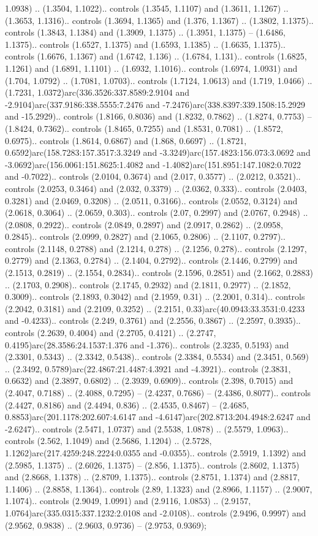 1.0938) .. (1.3504, 1.1022).. controls (1.3545, 1.1107) and (1.3611, 1.1267) .. (1.3653, 1.1316).. controls (1.3694, 1.1365) and (1.376, 1.1367) .. (1.3802, 1.1375).. controls (1.3843, 1.1384) and (1.3909, 1.1375) .. (1.3951, 1.1375) -- (1.6486, 1.1375).. controls (1.6527, 1.1375) and (1.6593, 1.1385) .. (1.6635, 1.1375).. controls (1.6676, 1.1367) and (1.6742, 1.136) .. (1.6784, 1.131).. controls (1.6825, 1.1261) and (1.6891, 1.1101) .. (1.6932, 1.1016).. controls (1.6974, 1.0931) and (1.704, 1.0792) .. (1.7081, 1.0703).. controls (1.7124, 1.0613) and (1.719, 1.0466) .. (1.7231, 1.0372)arc(336.3526:337.8589:2.9104 and -2.9104)arc(337.9186:338.5555:7.2476 and -7.2476)arc(338.8397:339.1508:15.2929 and -15.2929).. controls (1.8166, 0.8036) and (1.8232, 0.7862) .. (1.8274, 0.7753) -- (1.8424, 0.7362).. controls (1.8465, 0.7255) and (1.8531, 0.7081) .. (1.8572, 0.6975).. controls (1.8614, 0.6867) and (1.868, 0.6697) .. (1.8721, 0.6592)arc(158.7283:157.3517:3.3249 and -3.3249)arc(157.4823:156.073:3.0692 and -3.0692)arc(156.0061:151.8625:1.4082 and -1.4082)arc(151.8951:147.1082:0.7022 and -0.7022).. controls (2.0104, 0.3674) and (2.017, 0.3577) .. (2.0212, 0.3521).. controls (2.0253, 0.3464) and (2.032, 0.3379) .. (2.0362, 0.333).. controls (2.0403, 0.3281) and (2.0469, 0.3208) .. (2.0511, 0.3166).. controls (2.0552, 0.3124) and (2.0618, 0.3064) .. (2.0659, 0.303).. controls (2.07, 0.2997) and (2.0767, 0.2948) .. (2.0808, 0.2922).. controls (2.0849, 0.2897) and (2.0917, 0.2862) .. (2.0958, 0.2845).. controls (2.0999, 0.2827) and (2.1065, 0.2806) .. (2.1107, 0.2797).. controls (2.1148, 0.2788) and (2.1214, 0.278) .. (2.1256, 0.278).. controls (2.1297, 0.2779) and (2.1363, 0.2784) .. (2.1404, 0.2792).. controls (2.1446, 0.2799) and (2.1513, 0.2819) .. (2.1554, 0.2834).. controls (2.1596, 0.2851) and (2.1662, 0.2883) .. (2.1703, 0.2908).. controls (2.1745, 0.2932) and (2.1811, 0.2977) .. (2.1852, 0.3009).. controls (2.1893, 0.3042) and (2.1959, 0.31) .. (2.2001, 0.314).. controls (2.2042, 0.3181) and (2.2109, 0.3252) .. (2.2151, 0.33)arc(40.0943:33.3531:0.4233 and -0.4233).. controls (2.249, 0.3761) and (2.2556, 0.3867) .. (2.2597, 0.3935).. controls (2.2639, 0.4004) and (2.2705, 0.4121) .. (2.2747, 0.4195)arc(28.3586:24.1537:1.376 and -1.376).. controls (2.3235, 0.5193) and (2.3301, 0.5343) .. (2.3342, 0.5438).. controls (2.3384, 0.5534) and (2.3451, 0.569) .. (2.3492, 0.5789)arc(22.4867:21.4487:4.3921 and -4.3921).. controls (2.3831, 0.6632) and (2.3897, 0.6802) .. (2.3939, 0.6909).. controls (2.398, 0.7015) and (2.4047, 0.7188) .. (2.4088, 0.7295) -- (2.4237, 0.7686) -- (2.4386, 0.8077).. controls (2.4427, 0.8186) and (2.4494, 0.836) .. (2.4535, 0.8467) -- (2.4685, 0.8853)arc(201.1178:202.607:4.6147 and -4.6147)arc(202.8713:204.4948:2.6247 and -2.6247).. controls (2.5471, 1.0737) and (2.5538, 1.0878) .. (2.5579, 1.0963).. controls (2.562, 1.1049) and (2.5686, 1.1204) .. (2.5728, 1.1262)arc(217.4259:248.2224:0.0355 and -0.0355).. controls (2.5919, 1.1392) and (2.5985, 1.1375) .. (2.6026, 1.1375) -- (2.856, 1.1375).. controls (2.8602, 1.1375) and (2.8668, 1.1378) .. (2.8709, 1.1375).. controls (2.8751, 1.1374) and (2.8817, 1.1406) .. (2.8858, 1.1364).. controls (2.89, 1.1323) and (2.8966, 1.1157) .. (2.9007, 1.1074).. controls (2.9049, 1.0991) and (2.9116, 1.0853) .. (2.9157, 1.0764)arc(335.0315:337.1232:2.0108 and -2.0108).. controls (2.9496, 0.9997) and (2.9562, 0.9838) .. (2.9603, 0.9736) -- (2.9753, 0.9369);



